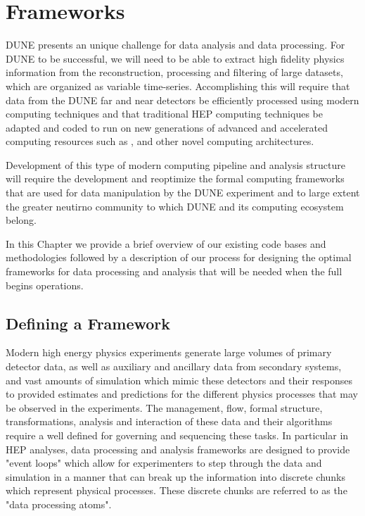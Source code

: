\documentclass[../main-v1.tex]{subfiles}
\begin{document}
\chapter{Frameworks }
\label{ch:fworks}

DUNE presents an unique challenge for data analysis and data processing. For DUNE to be successful, we will need to be able to extract high fidelity physics information from the reconstruction, processing and filtering of large datasets, which are organized as variable time-series.   Accomplishing this will require that data from the DUNE far and near detectors  be efficiently processed using modern computing techniques and that traditional HEP computing techniques be adapted and coded to run on new generations of advanced and accelerated computing resources such as ,  and other novel computing architectures.  

Development of this type of modern computing pipeline and analysis structure will require the development and reoptimize the formal computing frameworks that are used for data manipulation by the DUNE experiment and to large extent the greater neutirno community to which DUNE and its computing ecosystem belong.

In this Chapter we provide a brief overview of our existing code bases and methodologies followed by a description of our process for designing the optimal frameworks for data processing and analysis that will be needed when the full  begins operations.  

\section{Defining a Framework}

Modern high energy physics experiments generate large volumes of primary detector data, as well as auxiliary and ancillary data from secondary systems, and vast amounts of simulation which mimic these detectors and their responses to provided estimates and predictions for the different physics processes that may be observed in the experiments.  The management, flow, formal structure, transformations, analysis and interaction of these data and their algorithms require a well defined  for governing and sequencing these tasks.  In particular in HEP analyses, data processing and analysis frameworks are designed to provide "event loops" which allow for experimenters to step through the data and simulation in a manner that can break up the information into discrete chunks which represent physical processes.  These discrete chunks are referred to as the "data processing atoms".
\end{document}
